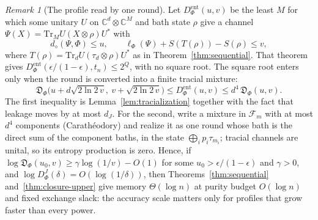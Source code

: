 \documentclass[11pt,a4paper]{article}
\theoremstyle{plain}
\theoremstyle{definition}
\theoremstyle{remark}
\newtheorem{remark}[theorem]{Remark}
\newcommand{\DChoi}{D^{J}}
\newcommand{\dJ}{d_J}
\newcommand{\ddia}{d_\diamond}
\newcommand{\Dsupp}{\mathfrak{D}}
\begin{document}
\begin{remark}[The profile read by one round]\label{rem:one-round-profile}
Let $D^{\mathrm{ent}}_\Phi(u,v)$ be the least $M$ for which some unitary $U$ on $\mathbb C^d\otimes\mathbb C^M$ and bath state $\rho$
give a channel $\Psi(X)=\mathrm{Tr}_MU(X\otimes\rho)U^*$ with
\[
\ddia(\Psi,\Phi)\le u,\qquad \ell_\Phi(\Psi)+S(T(\rho))-S(\rho)\le v,
\]
where $T(\rho)=\mathrm{Tr}_dU(\tau_d\otimes\rho)U^*$ as in Theorem~\ref{thm:sequential}. That theorem gives
$D^{\mathrm{ent}}_\Phi(\epsilon/(1-\epsilon),t_n)\le2^Q$, with no square root. The square root enters only when the round is converted into a finite
tracial mixture:
\[
\Dsupp_\Phi\big(u+d\sqrt{2\ln2\,v},\ v+\sqrt{2\ln2\,v}\big)\le D^{\mathrm{ent}}_\Phi(u,v)\le d^4\,\Dsupp_\Phi(u,v).
\]
The first inequality is Lemma~\ref{lem:tracialization} together with the fact that leakage moves by at most $\dJ$. For the second, write a
mixture in $\mathcal F_m$ with at most $d^4$ components (Carath\'eodory) and realize it as one round whose bath is the direct sum of the
component baths, in the state $\bigoplus_ip_i\tau_{m_i}$; tracial channels are unital, so its entropy production is zero. Hence, if
$\log\Dsupp_\Phi(u_0,v)\ge\gamma\log(1/v)-O(1)$ for some $u_0>\epsilon/(1-\epsilon)$ and $\gamma>0$, and $\log\DChoi_\Phi(\delta)=O(\log(1/\delta))$,
then Theorems~\ref{thm:sequential} and~\ref{thm:closure-upper} give memory $\Theta(\log n)$ at purity budget $O(\log n)$ and fixed
exchange slack: the accuracy scale matters only for profiles that grow faster than every power.
\end{remark}
\end{document}
